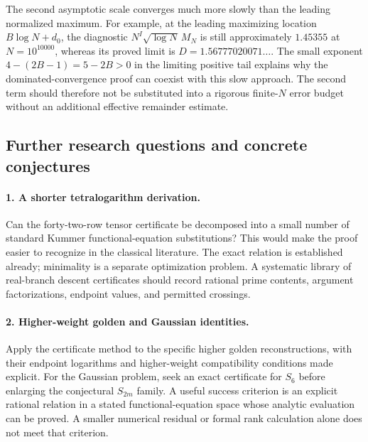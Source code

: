 The second asymptotic scale converges much more slowly than the
leading normalized maximum. For example, at the leading maximizing
location $B\log N+d_0$, the diagnostic
$N^I\sqrt{\log N}\,M_N$ is still approximately $1.45355$ at
$N=10^{10000}$, whereas its proved limit is
$D=1.56777020071\ldots$. The small exponent
$4-(2B-1)=5-2B>0$ in the limiting positive tail explains why
the dominated-convergence proof can coexist with this slow approach.
The second term should therefore not be substituted into a rigorous
finite-$N$ error budget without an additional effective remainder
estimate.

\subsection{Further research questions and concrete conjectures}

\paragraph{1. A shorter tetralogarithm derivation.}
Can the forty-two-row tensor certificate be decomposed into a small
number of standard Kummer functional-equation substitutions?
This would make the proof easier to recognize in the classical
literature. The exact relation is established already; minimality
is a separate optimization problem. A systematic library of
real-branch descent certificates should record rational prime
contents, argument factorizations, endpoint values, and permitted
crossings.

\paragraph{2. Higher-weight golden and Gaussian identities.}
Apply the certificate method to the specific higher golden
reconstructions, with their endpoint logarithms and higher-weight
compatibility conditions made explicit. For the Gaussian problem,
seek an exact certificate for $S_6$ before enlarging the conjectural
$S_{2m}$ family. A useful success criterion is an explicit rational
relation in a stated functional-equation space whose analytic
evaluation can be proved. A smaller numerical residual or formal
rank calculation alone does not meet that criterion.

